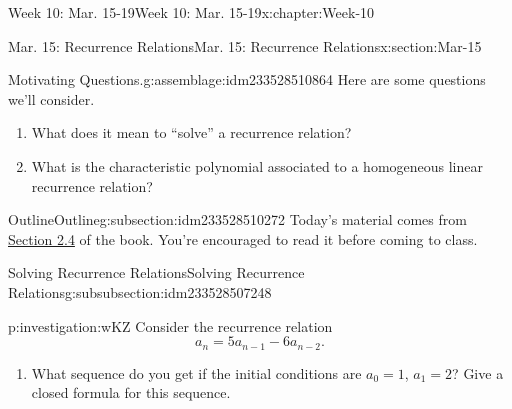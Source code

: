 \documentclass[oneside,10pt,]{book}
\numberwithin{equation}{section}
\begin{document}
%
%
\typeout{************************************************}
\typeout{************************************************}
%
\begin{chapterptx}{Week 10: Mar. 15-19}{}{Week 10: Mar. 15-19}{}{}{x:chapter:Week-10}
%
%
\typeout{************************************************}
\typeout{************************************************}
%
\begin{sectionptx}{Mar. 15: Recurrence Relations}{}{Mar. 15: Recurrence Relations}{}{}{x:section:Mar-15}
\begin{introduction}{}%
\begin{assemblage}{Motivating Questions.}{g:assemblage:idm233528510864}%
Here are some questions we'll consider. %
\begin{enumerate}
\item{}What does it mean to ``solve'' a recurrence relation?%
\item{}What is the characteristic polynomial associated to a homogeneous linear recurrence relation?%
\end{enumerate}
%
\end{assemblage}
\end{introduction}%
%
%
\typeout{************************************************}
\typeout{************************************************}
%
\begin{subsectionptx}{Outline}{}{Outline}{}{}{g:subsection:idm233528510272}
Today's material comes from \href{http://discrete.openmathbooks.org/dmoi3/sec_recurrence.html}{Section 2.4} of the book. You're encouraged to read it before coming to class.%
%
%
\typeout{************************************************}
\typeout{************************************************}
%
\begin{subsubsectionptx}{Solving Recurrence Relations}{}{Solving Recurrence Relations}{}{}{g:subsubsection:idm233528507248}
\begin{investigation}{}{p:investigation:wKZ}%
Consider the recurrence relation%
\begin{equation*}
a_n = 5a_{n-1} - 6a_{n-2}\text{.}
\end{equation*}
%
\begin{enumerate}
\item{}What sequence do you get if the initial conditions are \(a_0 = 1\), \(a_1 = 2\)? Give a closed formula for this sequence.%

\end{enumerate}
\end{investigation}
\end{subsubsectionptx}
\end{subsectionptx}
\end{sectionptx}
\end{chapterptx}
\end{document}
